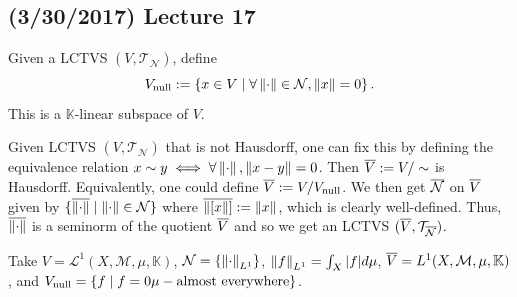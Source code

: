 \documentclass[11pt,leqno,oneside]{amsbook}
\numberwithin{thm}{section}
\newcommand{\M}{\mathcal{M}}
\newcommand{\Top}{\mathcal{T}} %
\newcommand{\cL}{\mathcal{L}}
\newcommand{\cN}{\mathcal{N}}
\newcommand{\norms}{\cN}
\begin{document}
\subsection*{(3/30/2017) Lecture 17}
\begin{defn}
  Given a LCTVS \((V,\Top_\norms)\), define \[
    V_{\text{null}} := \left\{ x \in V \st \forall \norm \in \norms,
      \norm[x] = 0 \right\}.
  \]
  This is a \(\mathbb{K}\)-linear subspace of \(V\).
\end{defn}
\begin{rmk}
  Given LCTVS \((V,\Top_\norms)\)  that is not Hausdorff, one can fix
  this by defining the equivalence relation \(x \sim y \iff \forall
  \norm, \norm[x-y] = 0\). Then \(\ov{V} := V/\sim\) is
  Hausdorff. Equivalently, one could define \(\ov{V} :=
  V/V_{\text{null}}\). We then get \(\ov{\norms}\) on \(\ov{V}\) given
  by \(\{\ov{\norm} \st \norm \in \norms\}\) where \(\ov{\norm[[x]]}
  := \norm[x]\), which is clearly well-defined. Thus, \(\ov{\norm}\)
  is a seminorm of the quotient \(\ov{V}\) and so we get an LCTVS
  \((\ov{V}, \Top_{\ov{\norms}})\). 
\end{rmk}
\begin{example}
  Take \(V = \cL^1(X,\M,\mu,\mathbb{K})\), \(\norms =
  \{\norm_{L^1}\}\), \(\norm[f]_{L^1} = \int_X |f|d\mu\), \(\ov{V} =
  L^1(X,\M,\mu,\mathbb{K})\), and \(V_\text{null} = \{f \st f=0
  \mu-\text{almost everywhere}\}\). 
\end{example}
\end{document}
